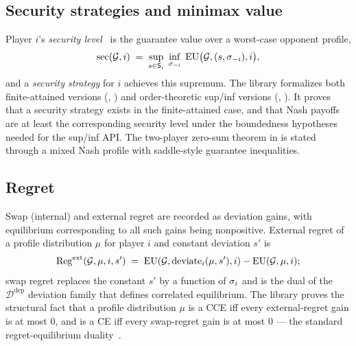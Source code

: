 
\subsection{Security strategies and minimax value}
\label{sec:solution-concepts:security}

Player $i$'s \emph{security level}~\citep{vNM1944} is the
guarantee value over a worst-case opponent profile,
\begin{equation}
\label{eq:security}
  \mathrm{sec}(\mathcal{G}, i) \;=\; \sup_{s \in \mathsf{S}_i}\;
    \inf_{\sigma_{-i}}\;
      \mathrm{EU}\bigl(\mathcal{G}, (s,\sigma_{-i}), i\bigr),
\end{equation}
and a \emph{security strategy} for $i$ achieves this supremum.
The library formalizes both finite-attained versions
(, ) and order-theoretic sup/inf
versions (, ).  It proves
that a security strategy exists in the finite-attained case, and that
Nash payoffs are at least the corresponding security level under the
boundedness hypotheses needed for the sup/inf API\@.  The two-player
zero-sum theorem in
 is stated through a mixed Nash profile
with saddle-style guarantee inequalities.


\subsection{Regret}
\label{sec:solution-concepts:regret}

Swap (internal) and external regret are recorded as deviation gains, with
equilibrium corresponding to all such gains being nonpositive.
External regret of a profile distribution $\mu$ for player $i$ and
constant deviation $s'$ is
\begin{equation}
\label{eq:regret}
  \mathrm{Reg}^{\mathrm{ext}}(\mathcal{G}, \mu, i, s') \;=\;
    \mathrm{EU}(\mathcal{G}, \mathrm{deviate}_i(\mu,s'), i)
    - \mathrm{EU}(\mathcal{G},\mu,i);
\end{equation}
swap regret replaces the constant $s'$ by a function of
$\sigma_i$ and is the dual of the $\mathcal{D}^{\mathrm{dep}}$
deviation family that defines correlated equilibrium.  The
library proves the structural fact that a profile distribution
$\mu$ is a CCE iff every external-regret gain is at most $0$, and
is a CE iff every swap-regret gain is at most $0$ — the standard
regret-equilibrium duality~\citep{HartMasColell2000}.

